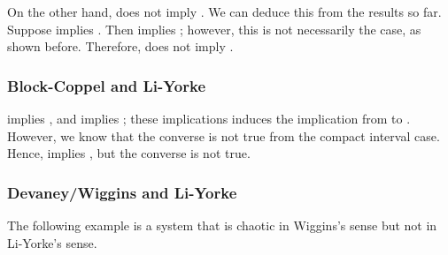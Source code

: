 \documentclass[10pt,twoside,draft]{book}
\begin{document}
On the other hand, \dev does not imply \blcp.
We can deduce this from the results so far.
Suppose \dev implies \blcp.
Then \dev implies \pte; however, this is not necessarily the case, as shown before.
Therefore, \dev does not imply \blcp.

\subsubsection*{Block-Coppel and Li-Yorke}
\blcp implies \pte, and \pte implies \liy; these implications induces the implication from \blcp to \liy.
However, we know that the converse is not true from the compact interval case.
Hence, \blcp implies \liy, but the converse is not true.

\subsubsection*{Devaney/Wiggins and Li-Yorke}
The following example is a system that is chaotic in Wiggins's sense but not in Li-Yorke's sense.
\end{document}
